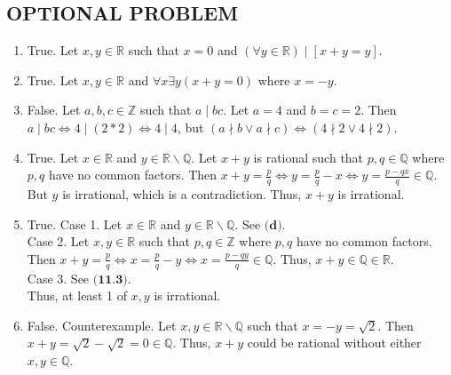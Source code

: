 \documentclass[11pt]{exam}
\begin{document}
\begin{enumerate}[leftmargin=0pt]
\section{OPTIONAL PROBLEM}
\begin{enumerate}[label=(\alph*)]
    \item True. Let $x, y \in \mathbb{R}$ such that $x = 0$ and $(\forall y \in \mathbb{R}) \mid [x + y = y]$.
    \item True. Let $x, y \in \mathbb{R}$ and $\forall x \exists y (x + y = 0)$ where $x = - y$.
    \item False. Let $a, b, c \in \mathbb{Z}$ such that $a \mid bc$. Let $a = 4$ and $b = c = 2$. Then $a \mid bc \Leftrightarrow 4 \mid (2*2) \Leftrightarrow 4 \mid 4$, but $(a \nmid b \lor a \nmid c) \Leftrightarrow (4 \nmid 2 \lor 4 \nmid 2)$.
    \item True. Let $x \in \mathbb{R}$ and $y \in \mathbb{R} \backslash \mathbb{Q}$. Let $x + y$ is rational such that $p, q \in \mathbb{Q}$ where $p, q$ have no common factors. Then $x + y = \frac{p}{q} \Leftrightarrow y = \frac{p}{q} - x \Leftrightarrow y = \frac{p - qx}{q} \in \mathbb{Q}$. But $y$ is irrational, which is a contradiction. Thus, $x + y$ is irrational.
    \item True.
    Case 1. Let $x \in \mathbb{R}$ and $y \in \mathbb{R} \backslash \mathbb{Q}$. See $\textbf{(d)}$.
    \\
    Case 2. Let $x, y \in \mathbb{R}$ such that $p, q \in \mathbb{Z}$ where $p, q$ have no common factors. Then $x + y = \frac{p}{q} \Leftrightarrow x = \frac{p}{q} - y \Leftrightarrow x = \frac{p - qy}{q} \in \mathbb{Q}$. Thus, $x + y \in \mathbb{Q} \in \mathbb{R}$.
    \\
    Case 3. See $\textbf{(11.3)}$. \\
    Thus, at least 1 of $x, y$ is irrational.
    \item False. Counterexample. Let $x, y \in \mathbb{R} \backslash \mathbb{Q}$ such that $x = -y = \sqrt{2}$. Then $x + y = \sqrt{2} - \sqrt{2} = 0 \in \mathbb{Q}$. Thus, $x + y$ could be rational without either $x, y \in \mathbb{Q}$.
        
\end{enumerate}

\end{enumerate}
\end{document}
